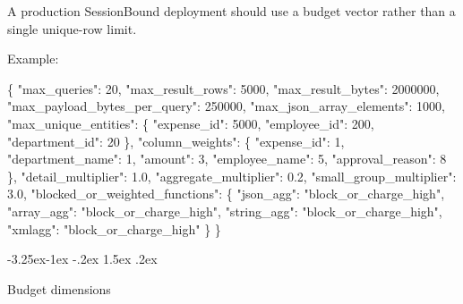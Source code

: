 \documentclass[10pt,twocolumn]{article}
\makeatletter
\newenvironment{Shaded}{}{}
\newcommand{\DataTypeTok}[1]{\textcolor[rgb]{0.56,0.13,0.00}{#1}}
\newcommand{\DecValTok}[1]{\textcolor[rgb]{0.25,0.63,0.44}{#1}}
\newcommand{\FloatTok}[1]{\textcolor[rgb]{0.25,0.63,0.44}{#1}}
\newcommand{\FunctionTok}[1]{\textcolor[rgb]{0.02,0.16,0.49}{#1}}
\newcommand{\StringTok}[1]{\textcolor[rgb]{0.25,0.44,0.63}{#1}}
\renewcommand\subsection{\@startsection{subsection}{2}{\z@}%
  {-3.25ex\@plus -1ex \@minus -.2ex}%
  {1.5ex \@plus .2ex}%
  {\normalfont\large\bfseries\raggedright}}
\makeatother
\begin{document}
A production SessionBound deployment should use a budget vector rather
than a single unique-row limit.

Example:

\begin{Shaded}
\begin{Highlighting}[]
\FunctionTok{\{}
  \DataTypeTok{"max\_queries"}\FunctionTok{:} \DecValTok{20}\FunctionTok{,}
  \DataTypeTok{"max\_result\_rows"}\FunctionTok{:} \DecValTok{5000}\FunctionTok{,}
  \DataTypeTok{"max\_result\_bytes"}\FunctionTok{:} \DecValTok{2000000}\FunctionTok{,}
  \DataTypeTok{"max\_payload\_bytes\_per\_query"}\FunctionTok{:} \DecValTok{250000}\FunctionTok{,}
  \DataTypeTok{"max\_json\_array\_elements"}\FunctionTok{:} \DecValTok{1000}\FunctionTok{,}
  \DataTypeTok{"max\_unique\_entities"}\FunctionTok{:} \FunctionTok{\{}
    \DataTypeTok{"expense\_id"}\FunctionTok{:} \DecValTok{5000}\FunctionTok{,}
    \DataTypeTok{"employee\_id"}\FunctionTok{:} \DecValTok{200}\FunctionTok{,}
    \DataTypeTok{"department\_id"}\FunctionTok{:} \DecValTok{20}
  \FunctionTok{\},}
  \DataTypeTok{"column\_weights"}\FunctionTok{:} \FunctionTok{\{}
    \DataTypeTok{"expense\_id"}\FunctionTok{:} \DecValTok{1}\FunctionTok{,}
    \DataTypeTok{"department\_name"}\FunctionTok{:} \DecValTok{1}\FunctionTok{,}
    \DataTypeTok{"amount"}\FunctionTok{:} \DecValTok{3}\FunctionTok{,}
    \DataTypeTok{"employee\_name"}\FunctionTok{:} \DecValTok{5}\FunctionTok{,}
    \DataTypeTok{"approval\_reason"}\FunctionTok{:} \DecValTok{8}
  \FunctionTok{\},}
  \DataTypeTok{"detail\_multiplier"}\FunctionTok{:} \FloatTok{1.0}\FunctionTok{,}
  \DataTypeTok{"aggregate\_multiplier"}\FunctionTok{:} \FloatTok{0.2}\FunctionTok{,}
  \DataTypeTok{"small\_group\_multiplier"}\FunctionTok{:} \FloatTok{3.0}\FunctionTok{,}
  \DataTypeTok{"blocked\_or\_weighted\_functions"}\FunctionTok{:} \FunctionTok{\{}
    \DataTypeTok{"json\_agg"}\FunctionTok{:} \StringTok{"block\_or\_charge\_high"}\FunctionTok{,}
    \DataTypeTok{"array\_agg"}\FunctionTok{:} \StringTok{"block\_or\_charge\_high"}\FunctionTok{,}
    \DataTypeTok{"string\_agg"}\FunctionTok{:} \StringTok{"block\_or\_charge\_high"}\FunctionTok{,}
    \DataTypeTok{"xmlagg"}\FunctionTok{:} \StringTok{"block\_or\_charge\_high"}
  \FunctionTok{\}}
\FunctionTok{\}}
\end{Highlighting}
\end{Shaded}

\hypertarget{budget-dimensions}{%
\subsection{Budget dimensions}\label{budget-dimensions}}
\end{document}
